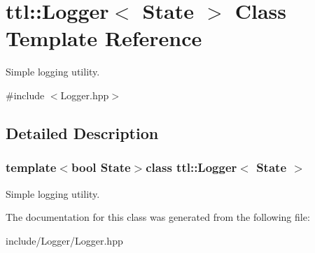 \hypertarget{classttl_1_1_logger}{\section{ttl\-:\-:Logger$<$ State $>$ Class Template Reference}
\label{classttl_1_1_logger}
}


Simple logging utility.  




{\ttfamily \#include $<$Logger.\-hpp$>$}



\subsection{Detailed Description}
\subsubsection*{template$<$bool State$>$class ttl\-::\-Logger$<$ State $>$}

Simple logging utility. 

The documentation for this class was generated from the following file\-:\begin{DoxyCompactItemize}
\item 
include/\-Logger/Logger.\-hpp\end{DoxyCompactItemize}
